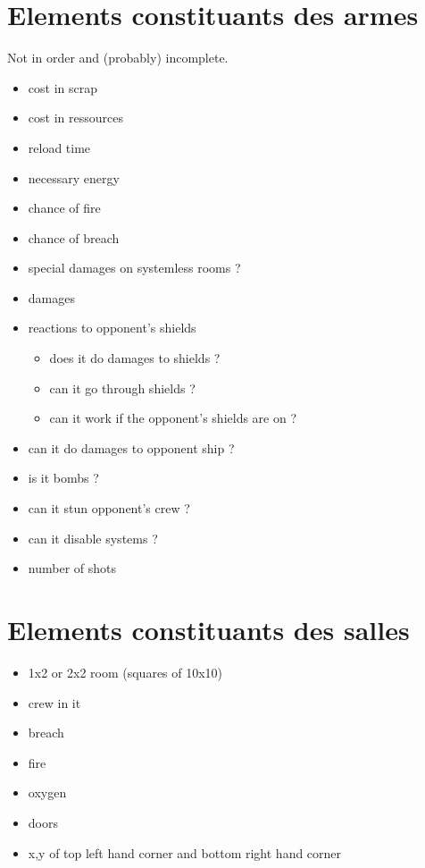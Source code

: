 \documentclass[a4paper, 11pt]{article}
\begin{document}
\section{Elements constituants des armes}

Not in order and (probably) incomplete.

\begin{itemize}
	\item cost in scrap
	\item cost in ressources
	\item reload time
	\item necessary energy
	\item chance of fire
	\item chance of breach
	\item special damages on systemless rooms ?
	\item damages
	\item reactions to opponent's shields 
	\begin{itemize}
		\item does it do damages to shields ?
		\item can it go through shields ?
		\item can it work if the opponent's shields are on ?
	\end{itemize}
	\item can it do damages to opponent ship ?
	\item is it bombs ?
	\item can it stun opponent's crew ?
	\item can it disable systems ?
	\item number of shots
\end{itemize}


\section{Elements constituants des salles}

\begin{itemize}
	\item 1x2 or 2x2 room (squares of 10x10)
	\item crew in it
	\item breach
	\item fire
	\item oxygen
	\item doors
	\item x,y of top left hand corner and bottom right hand corner
\end{itemize}
\end{document}
